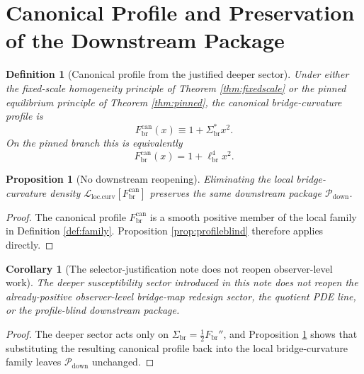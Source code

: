 \documentclass[11pt]{article}
\newcommand{\CurvScale}{\ell_{\mathrm{br}}}
\newcommand{\CurvProfile}{F_{\mathrm{br}}}
\newcommand{\CurvProfileCan}{F_{\mathrm{br}}^{\mathrm{can}}}
\newcommand{\DownPkg}{\mathscr P_{\mathrm{down}}}
\newcommand{\RespSus}{\Sigma_{\mathrm{br}}}
\newcommand{\RespSusEq}{\Sigma_{\mathrm{br}}^{\ast}}
\newtheorem{definition}{Definition}
\newtheorem{proposition}{Proposition}
\newtheorem{corollary}{Corollary}
\begin{document}
\section{Canonical Profile and Preservation of the Downstream Package}

\begin{definition}[Canonical profile from the justified deeper sector]
\label{def:canonical}
Under either the fixed-scale homogeneity principle of Theorem \ref{thm:fixedscale} or the pinned equilibrium principle of Theorem \ref{thm:pinned}, the canonical bridge-curvature profile is
\begin{equation}
\CurvProfileCan(x)\equiv 1+\RespSusEq x^2.
\label{eq:canonical}
\end{equation}
On the pinned branch this is equivalently
\begin{equation}
\CurvProfileCan(x)=1+\CurvScale^4x^2.
\label{eq:canonicalell}
\end{equation}
\end{definition}

\begin{proposition}[No downstream reopening]
\label{prop:noreopen}
Eliminating the local bridge-curvature density \(\mathcal L_{\mathrm{loc.curv}}[\CurvProfileCan]\) preserves the same downstream package \(\DownPkg\).
\end{proposition}

\begin{proof}
The canonical profile \(\CurvProfileCan\) is a smooth positive member of the local family in Definition \ref{def:family}. Proposition \ref{prop:profileblind} therefore applies directly.
\end{proof}

\begin{corollary}[The selector-justification note does not reopen observer-level work]
\label{cor:noobserver}
The deeper susceptibility sector introduced in this note does not reopen the already-positive observer-level bridge-map redesign sector, the quotient PDE line, or the profile-blind downstream package.
\end{corollary}

\begin{proof}
The deeper sector acts only on \(\RespSus=\frac12\CurvProfile''\), and Proposition \ref{prop:noreopen} shows that substituting the resulting canonical profile back into the local bridge-curvature family leaves \(\DownPkg\) unchanged.
\end{proof}
\end{document}
